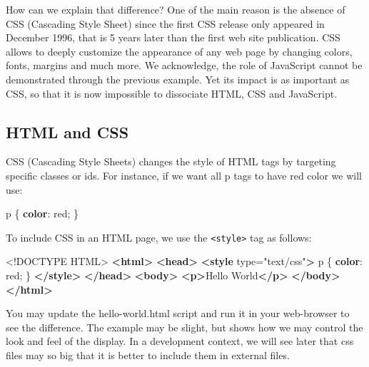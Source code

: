 \documentclass[]{book}
\newenvironment{Shaded}{\begin{snugshade}}{\end{snugshade}}
\newcommand{\DataTypeTok}[1]{\textcolor[rgb]{0.13,0.29,0.53}{#1}}
\newcommand{\DecValTok}[1]{\textcolor[rgb]{0.00,0.00,0.81}{#1}}
\newcommand{\KeywordTok}[1]{\textcolor[rgb]{0.13,0.29,0.53}{\textbf{#1}}}
\newcommand{\NormalTok}[1]{#1}
\newcommand{\OtherTok}[1]{\textcolor[rgb]{0.56,0.35,0.01}{#1}}
\newcommand{\StringTok}[1]{\textcolor[rgb]{0.31,0.60,0.02}{#1}}
\begin{document}
How can we explain that difference? One of the main reason is the absence of CSS (Cascading Style Sheet) since the first CSS release only appeared in December 1996, that is 5 years later than the first web site publication. CSS allows to deeply customize the appearance of any web page by changing colors, fonts, margins and much more. We acknowledge, the role of JavaScript cannot be demonstrated through the previous example. Yet its impact is as important as CSS, so that it is now impossible to dissociate HTML, CSS and JavaScript.

\hypertarget{html-and-css}{%
\subsection{HTML and CSS}\label{html-and-css}}

CSS (Cascading Style Sheets) changes the style of HTML tags by targeting specific classes or ids. For instance, if we want all p tags to have red color we will use:

\begin{Shaded}
\begin{Highlighting}[]
\NormalTok{p \{}
  \KeywordTok{color}\NormalTok{: }\DecValTok{red}\NormalTok{;}
\NormalTok{\}}
\end{Highlighting}
\end{Shaded}

To include CSS in an HTML page, we use the \texttt{\textless{}style\textgreater{}} tag as follows:

\begin{Shaded}
\begin{Highlighting}[]
\DataTypeTok{<!DOCTYPE }\NormalTok{HTML}\DataTypeTok{>}
\KeywordTok{<html>}
  \KeywordTok{<head>}
    \KeywordTok{<style}\OtherTok{ type=}\StringTok{"text/css"}\KeywordTok{>}
\NormalTok{      p \{}
        \KeywordTok{color}\NormalTok{: }\DecValTok{red}\NormalTok{;}
\NormalTok{      \}}
    \KeywordTok{</style>}
  \KeywordTok{</head>}
  \KeywordTok{<body>}
  \KeywordTok{<p>}\NormalTok{Hello World}\KeywordTok{</p>}
  \KeywordTok{</body>}
\KeywordTok{</html>}
\end{Highlighting}
\end{Shaded}

You may update the hello-world.html script and run it in your web-browser to see the difference. The example may be slight, but shows how we may control the look and feel of the display. In a development context, we will see later that css files may so big that it is better to include them in external files.
\end{document}
